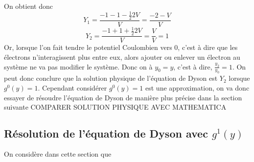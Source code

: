 \documentclass[12pt]{article}
\begin{document}
On obtient donc 
\begin{equation}
 Y_1 = \frac{-1 -1 - \frac{1}{2} 2 V }{V} =\frac{-2 -V}{V}
\end{equation}
\begin{equation}
 Y_2 = \frac{-1 + 1 +\frac{1}{2}2V }{V} = \frac{V}{V} = 1
\end{equation}
Or, lorsque l'on fait tendre le potentiel Coulombien vers 0, c'est \`a dire que les \'electrons n'interagissent plus entre eux, alors ajouter ou enlever un \'electron au syst\`eme ne va pas modifier le syst\`eme. Donc on \`a $y_0 = y$, c'est à dire, $\frac{y_2}{y_0} = 1$.
On peut donc conclure que la solution physique de l'\'equation de Dyson est $Y_2$ lorsque $g^0(y) = 1$.
\newline
Cependant consid\'erer $g^0(y) = 1$ est une approximation, on va donc essayer de r\'esoudre l'\'equation de Dyson de mani\`ere plus pr\'ecise dans la section suivante
COMPARER SOLUTION PHYSIQUE AVEC MATHEMATICA
\subsection{R\'esolution de l'\'equation de Dyson avec $g^1(y)$}
On consid\`ere dans cette section que 
\end{document}
